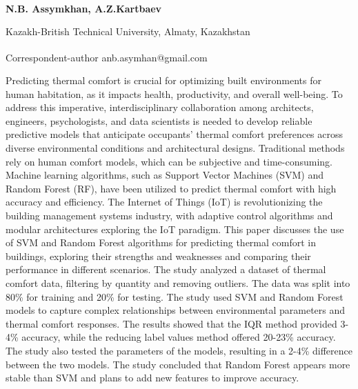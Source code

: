 
\begin{articleheader}

{\bfseries N.B. Assymkhan\textsuperscript{\envelope }, A.Z.Kartbaev}
\end{articleheader}

\begin{affiliation}
Kazakh-British Technical University, Almaty, Kazakhstan

\raggedright {\bfseries \textsuperscript{\envelope }}Correspondent-author anb.asymhan@gmail.com
\end{affiliation}

Predicting thermal comfort is crucial for optimizing built environments
for human habitation, as it impacts health, productivity, and overall
well-being. To address this imperative, interdisciplinary collaboration
among architects, engineers, psychologists, and data scientists is
needed to develop reliable predictive models that anticipate occupants'
thermal comfort preferences across diverse environmental conditions and
architectural designs. Traditional methods rely on human comfort models,
which can be subjective and time-consuming. Machine learning algorithms,
such as Support Vector Machines (SVM) and Random Forest (RF), have been
utilized to predict thermal comfort with high accuracy and efficiency.
The Internet of Things (IoT) is revolutionizing the building management
systems industry, with adaptive control algorithms and modular
architectures exploring the IoT paradigm. This paper discusses the use
of SVM and Random Forest algorithms for predicting thermal comfort in
buildings, exploring their strengths and weaknesses and comparing their
performance in different scenarios. The study analyzed a dataset of
thermal comfort data, filtering by quantity and removing outliers. The
data was split into 80\% for training and 20\% for testing. The study
used SVM and Random Forest models to capture complex relationships
between environmental parameters and thermal comfort responses. The
results showed that the IQR method provided 3-4\% accuracy, while the
reducing label values method offered 20-23\% accuracy. The study also
tested the parameters of the models, resulting in a 2-4\% difference
between the two models. The study concluded that Random Forest appears
more stable than SVM and plans to add new features to improve accuracy.

